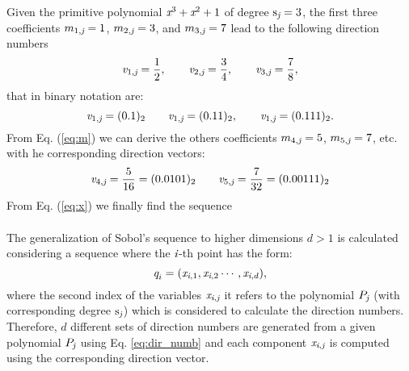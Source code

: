 Given the primitive polynomial $\textit{x}^3+\textit{x}^2+1$ of degree $\textrm{s}_{\textit{j}}=3$, the first three coefficients $m_{1, \textit{j}}=1$, 
$m_{2, \textit{j}}=3$, and $m_{3, \textit{j}}=7$ lead to the following direction numbers 
\begin{equation}
\textit{v}_{1,\textit{j}} = \frac{1}{2}, \qquad \textit{v}_{2,\textit{j}} = \frac{3}{4}, \qquad \textit{v}_{3,\textit{j}}= \frac{7}{8},
\end{equation}
that in binary notation are:
\begin{equation}
\textit{v}_{1,\textit{j}} = (0.1)_2 \qquad \textit{v}_{1,\textit{j}} = (0.11)_2, \qquad \textit{v}_{1,\textit{j}} = (0.111)_2.
\end{equation}
From Eq. (\ref{eq:m}) we can derive the others coefficients $m_{4,\textit{j}}=5$, $m_{5,\textit{j}}=7$, etc. with he corresponding direction vectors:
\begin{equation}
\textit{v}_{4,\textit{j}} = \frac{5}{16} = (0.0101)_2  \qquad \textit{v}_{5,\textit{j}} = \frac{7}{32}=(0.00111)_2
\end{equation}
From Eq. (\ref{eq:x}) we finally find the sequence
\begin{equation}
\end{equation}
\\ \indent
The generalization of Sobol's sequence to higher dimensions $d>1$ is calculated considering a sequence where the $\textit{i}$-th point has the form:
\begin{equation}
\textit{q}_{i} = (\textit{x}_{\textit{i}, 1},\textit{x}_{\textit{i}, 2} \cdots, \textit{x}_{\textit{i}, d}),
\end{equation}
where the second index of the variables $\textit{x}_{\textit{i}, \textit{j}}$ it refers to the polynomial $P_{\textit{j}}$ (with corresponding degree $\textrm{s}_{\textit{j}}$) which is considered to calculate the direction numbers. Therefore, $d$ different sets of direction numbers are generated from a given polynomial $P_{\textit{j}}$ using Eq. \ref{eq:dir_numb} and each component $\textit{x}_{\textit{i},\textit{j}}$ is computed using the corresponding direction vector. 